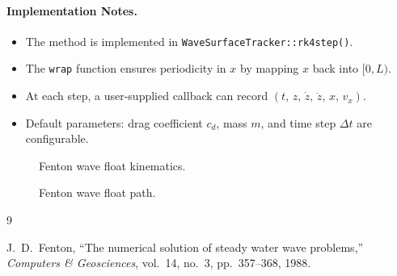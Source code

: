 \documentclass[journal,10pt,twocolumn]{IEEEtran}
\def\_{}%
\begin{document}
    \paragraph{Implementation Notes.}
    \begin{itemize}[leftmargin=1.4em]
        \item The method is implemented in \texttt{WaveSurfaceTracker::rk4\_step()}.
        \item The \texttt{wrap} function ensures periodicity in $x$ by mapping $x$ back into $[0,L)$.
        \item At each step, a user-supplied callback can record $(t,\,z,\,\dot z,\,\ddot z,\,x,\,v_x)$.
        \item Default parameters: drag coefficient $c_d$, mass $m$, and time step $\Delta t$ are configurable.
    \end{itemize}

    \begin{figure}[!t]
        \centering
        \resizebox{\linewidth}{!}{}
        \caption{Fenton wave float kinematics.}
        \label{fig:waveKinematics}
    \end{figure}

    \begin{figure}[!t]
        \centering
        \resizebox{\linewidth}{!}{}
        \caption{Fenton wave float path.}
        \label{fig:waveParticlePath}
    \end{figure}

    \begin{thebibliography}{9}

        J.~D.~Fenton, ``The numerical solution of steady water wave problems,'' \emph{Computers \& Geosciences}, vol.~14, no.~3, pp.~357--368, 1988.

    \end{thebibliography}
\end{document}

